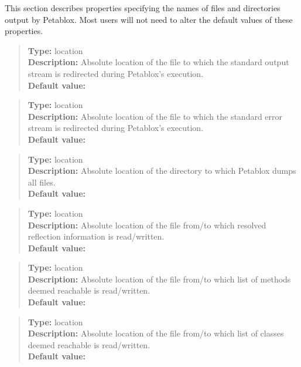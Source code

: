 This section describes properties specifying the names of files and directories output by Petablox.
Most users will not need to alter the default values of these properties.

\begin{quote}
{\bf Type:} location \\
{\bf Description:} Absolute location of the file to which the standard output stream is redirected during Petablox's execution. \\
{\bf Default value:} 
\end{quote}

\begin{quote}
{\bf Type:} location  \\
{\bf Description:} Absolute location of the file to which the standard error stream is redirected during Petablox's execution. \\
{\bf Default value:} 
\end{quote}

\begin{quote}
{\bf Type:} location \\
{\bf Description:} Absolute location of the directory to which Petablox dumps all files. \\
{\bf Default value:} 
\end{quote}

\begin{quote}
{\bf Type:} location  \\
{\bf Description:} Absolute location of the file from/to which resolved reflection information is read/written. \\
{\bf Default value:} 
\end{quote}

\begin{quote}
{\bf Type:} location  \\
{\bf Description:} Absolute location of the file from/to which list of methods deemed reachable is read/written. \\
{\bf Default value:} 
\end{quote}

\begin{quote}
{\bf Type:} location  \\
{\bf Description:} Absolute location of the file from/to which list of classes deemed reachable is read/written.  \\
{\bf Default value:} 
\end{quote}

